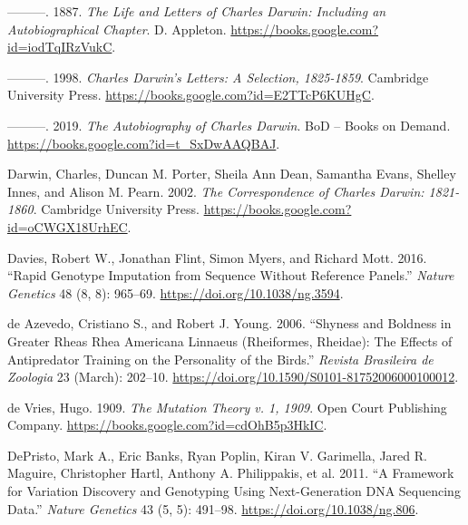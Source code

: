 \documentclass[
]{book}
\newlength{\cslhangindent}
\newlength{\cslentryspacingunit} %
\newenvironment{CSLReferences}[2] %
 {%
  \setlength{\parindent}{0pt}
  \ifodd #1
  \let\oldpar\par
  \def\par{\hangindent=\cslhangindent\oldpar}
  \fi
  \setlength{\parskip}{#2\cslentryspacingunit}
 }%
 {}
\begin{document}
\begin{CSLReferences}{1}{0}
\leavevmode{}%
---------. 1887. \emph{The {Life} and {Letters} of {Charles Darwin}: {Including} an {Autobiographical Chapter}}. {D. Appleton}. \url{https://books.google.com?id=iodTqIRzVukC}.

\leavevmode{}%
---------. 1998. \emph{Charles {Darwin}'s {Letters}: {A Selection}, 1825-1859}. {Cambridge University Press}. \url{https://books.google.com?id=E2TTcP6KUHgC}.

\leavevmode{}%
---------. 2019. \emph{The {Autobiography} of {Charles Darwin}}. {BoD -- Books on Demand}. \url{https://books.google.com?id=t_SxDwAAQBAJ}.

\leavevmode{}%
Darwin, Charles, Duncan M. Porter, Sheila Ann Dean, Samantha Evans, Shelley Innes, and Alison M. Pearn. 2002. \emph{The {Correspondence} of {Charles Darwin}: 1821-1860}. {Cambridge University Press}. \url{https://books.google.com?id=oCWGX18UrhEC}.

\leavevmode{}%
Davies, Robert W., Jonathan Flint, Simon Myers, and Richard Mott. 2016. {``Rapid Genotype Imputation from Sequence Without Reference Panels.''} \emph{Nature Genetics} 48 (8, 8): 965--69. \url{https://doi.org/10.1038/ng.3594}.

\leavevmode{}%
de Azevedo, Cristiano S., and Robert J. Young. 2006. {``Shyness and Boldness in Greater Rheas {Rhea} Americana {Linnaeus} ({Rheiformes}, {Rheidae}): The Effects of Antipredator Training on the Personality of the Birds.''} \emph{Revista Brasileira de Zoologia} 23 (March): 202--10. \url{https://doi.org/10.1590/S0101-81752006000100012}.

\leavevmode{}%
de Vries, Hugo. 1909. \emph{The {Mutation} Theory v. 1, 1909}. {Open Court Publishing Company}. \url{https://books.google.com?id=cdOhB5p3HkIC}.

\leavevmode{}%
DePristo, Mark A., Eric Banks, Ryan Poplin, Kiran V. Garimella, Jared R. Maguire, Christopher Hartl, Anthony A. Philippakis, et al. 2011. {``A Framework for Variation Discovery and Genotyping Using Next-Generation {DNA} Sequencing Data.''} \emph{Nature Genetics} 43 (5, 5): 491--98. \url{https://doi.org/10.1038/ng.806}.


\end{CSLReferences}
\end{document}
